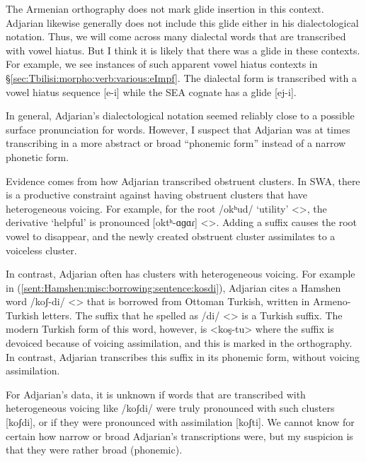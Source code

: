 \documentclass[output=paper]{langscibook}
\begin{document}
The Armenian orthography does not mark glide insertion in this context. Adjarian likewise generally does not include this glide either in his dialectological notation. Thus, we will come across many dialectal words that are transcribed with vowel hiatus. But I think it is likely  that there was a glide in these  contexts. For example, we see instances of such apparent vowel hiatus contexts in \S\ref{sec:Tbilisi:morpho:verb:various:eImpf}. The dialectal form is transcribed with a vowel hiatus sequence [e-i] while the SEA cognate has a glide [ej-i]. 


\label{sec:HossepIntro:phonotransc:adj:implicit:level of abstraction}

In general, Adjarian's dialectological notation seemed reliably close to a possible surface pronunciation for words. However, I suspect that Adjarian was at times transcribing in a more abstract or broad ``phonemic form'' instead of a narrow phonetic form.

Evidence comes from    how Adjarian transcribed obstruent clusters. In SWA, there is a productive constraint against having obstruent clusters that have heterogeneous voicing. For example, for the root /okʰud/ `utility' <>, the derivative `helpful' is pronounced [oktʰ-ɑɡɑɾ] <>. Adding a suffix causes the root  vowel to disappear, and the newly created obstruent cluster assimilates to a voiceless cluster. 

In contrast, Adjarian often has clusters with heterogeneous voicing. For example in (\ref{sent:Hamshen:misc:borrowing:sentence:kosdi}), Adjarian cites a Hamshen word /koʃ-di/ <> that is borrowed from Ottoman Turkish, written in Armeno-Turkish letters. The suffix that he spelled as /di/ <> is a Turkish suffix.  The modern Turkish form of this word, however, is <koş-tu> where the suffix is devoiced because of voicing assimilation,  and this is marked in the orthography. In contrast, Adjarian transcribes this suffix in its phonemic form, without voicing assimilation.

For Adjarian's data, it is unknown if words that are transcribed with heterogeneous voicing like /koʃdi/ were truly pronounced with such clusters [koʃdi], or if they were pronounced with assimilation [koʃti]. We cannot know for certain how narrow or broad  Adjarian's transcriptions were, but my suspicion is that they were rather broad (phonemic). 
\end{document}
